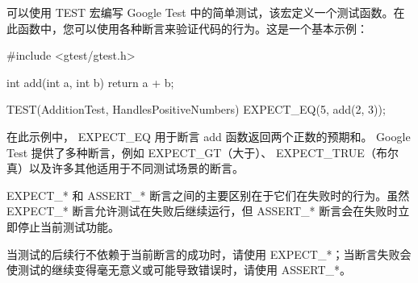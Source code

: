 可以使用 TEST 宏编写 Google Test 中的简单测试，该宏定义一个测试函数。在此函数中，您可以使用各种断言来验证代码的行为。这是一个基本示例：

\begin{shell}
#include <gtest/gtest.h>

int add(int a, int b) {
    return a + b;
}

TEST(AdditionTest, HandlesPositiveNumbers) {
    EXPECT_EQ(5, add(2, 3));
}
\end{shell}

在此示例中， EXPECT\_EQ 用于断言 add 函数返回两个正数的预期和。 Google Test 提供了多种断言，例如 EXPECT\_GT（大于）、 EXPECT\_TRUE（布尔真）以及许多其他适用于不同测试场景的断言。

EXPECT\_* 和 ASSERT\_* 断言之间的主要区别在于它们在失败时的行为。虽然 EXPECT\_* 断言允许测试在失败后继续运行，但 ASSERT\_* 断言会在失败时立即停止当前测试功能。

当测试的后续行不依赖于当前断言的成功时，请使用 EXPECT\_*；当断言失败会使测试的继续变得毫无意义或可能导致错误时，请使用 ASSERT\_*。